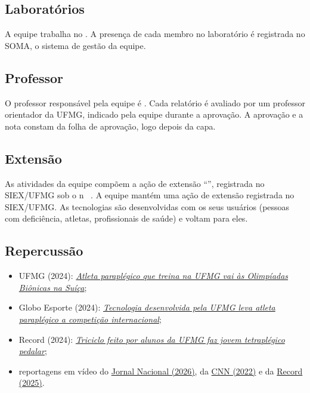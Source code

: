 \subsection{Laboratórios}
A equipe trabalha no . A presença de cada membro no laboratório é
registrada no SOMA, o sistema de gestão da equipe.

\subsection{Professor}
  {O professor responsável pela equipe é . }
  {}%
Cada relatório é avaliado por um professor orientador da UFMG, indicado pela equipe durante a
aprovação. A aprovação e a nota constam da folha de aprovação, logo depois da capa.

\subsection{Extensão}
  {As atividades da equipe compõem a ação de extensão \enquote{},
   registrada no \mbox{SIEX/UFMG} sob o n\textordmasculine~%
   .}
  {A equipe mantém uma ação de extensão registrada no \mbox{SIEX/UFMG}.}
As tecnologias são desenvolvidas com os seus usuários (pessoas com deficiência, atletas,
profissionais de saúde) e voltam para eles.

\subsection{Repercussão}
\begin{itemize}
  \item UFMG (2024): \href{https://www3.ufmg.br/comunicacao/noticias/atleta-paraplegico-que-treina-na-ufmg-vai-as-olimpiadas-bionicas-na-suica}{\emph{Atleta paraplégico que treina na UFMG vai às Olimpíadas Biônicas na Suíça}};
  \item Globo Esporte (2024): \href{https://ge.globo.com/mg/noticia/2024/10/21/tecnologia-desenvolvida-pela-ufmg-leva-atleta-paraplegico-a-competicao-internacional.ghtml}{\emph{Tecnologia desenvolvida pela UFMG leva atleta paraplégico a competição internacional}};
  \item Record (2024): \href{https://noticias.r7.com/minas-gerais/balanco-geral-mg/video/triciclo-feito-por-alunos-da-ufmg-faz-jovem-tetraplegico-pedalar-01112024/}{\emph{Triciclo feito por alunos da UFMG faz jovem tetraplégico pedalar}};
  \item reportagens em vídeo do \href{https://www.youtube.com/watch?v=AdOeBTOeMu0}{Jornal Nacional (2026)}, da
    \href{https://www.youtube.com/watch?v=Fi6vx_Yf8EY}{CNN (2022)} e da \href{https://www.youtube.com/watch?v=pytrfROeAVU}{Record (2025)}.
\end{itemize}

